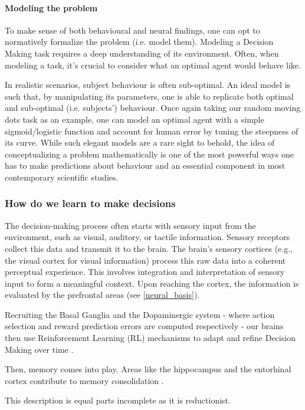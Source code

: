 \documentclass[11pt]{article}
\begin{document}
\paragraph{Modeling the problem}
To make sense of both behavioural and neural findings, one can opt to normatively formalize the problem (i.e. model them). Modeling a Decision Making task requires a deep understanding of its environment. Often, when modeling a task, it's crucial to consider what an optimal agent would behave like.

In realistic scenarios, subject behaviour is often sub-optimal. An ideal model is such that, by manipulating its parameters, one is able to replicate both optimal and sub-optimal (i.e. subjects') behaviour. Once again taking our random moving dots task as an example, one can model an optimal agent with a simple sigmoid/logistic function and account for human error by tuning the steepness of its curve.
While such elegant models are a rare sight to behold, the idea of conceptualizing a problem mathematically is one of the most powerful ways one has to make predictions about behaviour and an essential component in most contemporary scientific studies.


\subsubsection{How do we learn to make decisions}
The decision-making process often starts with sensory input from the environment, such as visual, auditory, or tactile information. Sensory receptors collect this data and transmit it to the brain. \cite{mesulam1998sensation}
The brain's sensory cortices (e.g., the visual cortex for visual information) process this raw data into a coherent perceptual experience. This involves integration and interpretation of sensory input to form a meaningful context.
Upon reaching the cortex, the information is evaluated by the prefrontal areas (see \ref{neural_basis}).

 Recruiting the Basal Ganglia and the Dopaminergic system - where action selection and reward prediction errors are computed respectively - our brains then use Reinforcement Learning (RL) mechanisms to adapt and refine Decision Making over time \cite{schultz1997neural}.

Then, memory comes into play. Areas like the hippocampus and the entorhinal cortex contribute to memory consolidation \cite{squire1991medial}.

This description is equal parts incomplete as it is reductionist.
\end{document}
